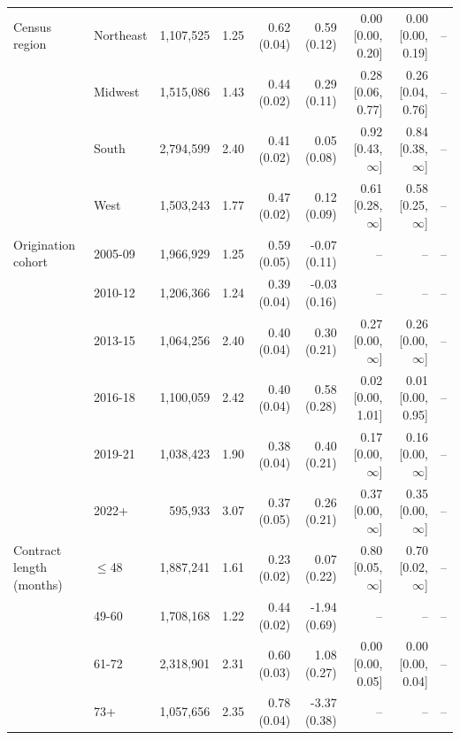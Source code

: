 \begin{tabular}{llrrrrrrr}
\addlinespace
Census region & Northeast & 1,107,525 & 1.25 & 0.62 (0.04) & 0.59 (0.12) & 0.00 [0.00, 0.20] & 0.00 [0.00, 0.19] & -- \\
 & Midwest & 1,515,086 & 1.43 & 0.44 (0.02) & 0.29 (0.11) & 0.28 [0.06, 0.77] & 0.26 [0.04, 0.76] & -- \\
 & South & 2,794,599 & 2.40 & 0.41 (0.02) & 0.05 (0.08) & 0.92 [0.43, $\infty$] & 0.84 [0.38, $\infty$] & -- \\
 & West & 1,503,243 & 1.77 & 0.47 (0.02) & 0.12 (0.09) & 0.61 [0.28, $\infty$] & 0.58 [0.25, $\infty$] & -- \\
\addlinespace
Origination cohort & 2005-09 & 1,966,929 & 1.25 & 0.59 (0.05) & -0.07 (0.11) & -- & -- & -- \\
 & 2010-12 & 1,206,366 & 1.24 & 0.39 (0.04) & -0.03 (0.16) & -- & -- & -- \\
 & 2013-15 & 1,064,256 & 2.40 & 0.40 (0.04) & 0.30 (0.21) & 0.27 [0.00, $\infty$] & 0.26 [0.00, $\infty$] & -- \\
 & 2016-18 & 1,100,059 & 2.42 & 0.40 (0.04) & 0.58 (0.28) & 0.02 [0.00, 1.01] & 0.01 [0.00, 0.95] & -- \\
 & 2019-21 & 1,038,423 & 1.90 & 0.38 (0.04) & 0.40 (0.21) & 0.17 [0.00, $\infty$] & 0.16 [0.00, $\infty$] & -- \\
 & 2022+ & 595,933 & 3.07 & 0.37 (0.05) & 0.26 (0.21) & 0.37 [0.00, $\infty$] & 0.35 [0.00, $\infty$] & -- \\
\addlinespace
Contract length (months) & $\le$48 & 1,887,241 & 1.61 & 0.23 (0.02) & 0.07 (0.22) & 0.80 [0.05, $\infty$] & 0.70 [0.02, $\infty$] & -- \\
 & 49-60 & 1,708,168 & 1.22 & 0.44 (0.02) & -1.94 (0.69) & -- & -- & -- \\
 & 61-72 & 2,318,901 & 2.31 & 0.60 (0.03) & 1.08 (0.27) & 0.00 [0.00, 0.05] & 0.00 [0.00, 0.04] & -- \\
 & 73+ & 1,057,656 & 2.35 & 0.78 (0.04) & -3.37 (0.38) & -- & -- & -- \\
\bottomrule
\end{tabular}
